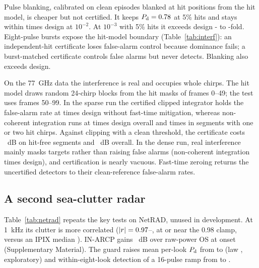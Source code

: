 \documentclass[journal]{IEEEtran}
\begin{document}
Pulse blanking, calibrated on clean episodes blanked at hit positions from the hit model, is cheaper but not certified. It keeps $P_{\rm d}=0.78$ at 5\% hits and stays within \BlankPfaMax{} times design at $10^{-2}$. At $10^{-3}$ with 5\% hits it exceeds design \BlankFiveThreeMin- to \BlankFiveThreeMax-fold. Eight-pulse bursts expose the hit-model boundary (Table~\ref{tab:interf}): an independent-hit certificate loses false-alarm control because dominance fails; a burst-matched certificate controls false alarms but never detects. Blanking also exceeds design.

On the 77~GHz data the interference is real and occupies whole chirps. The hit model draws random 24-chirp blocks from the hit masks of frames 0--49; the test uses frames 50--99. In the sparse run the certified clipped integrator holds the false-alarm rate at \JCertPfaC{} times design without fast-time mitigation, whereas non-coherent integration runs at \JDinPfaC{} times design overall and \JDinPfaCone{} times in segments with one or two hit chirps. Against clipping with a clean threshold, the certificate costs \JCertCostClean~dB on hit-free segments and \JCertCostAll~dB overall. In the dense run, real interference mainly masks targets rather than raising false alarms (non-coherent integration \JDinPfaA{} times design), and certification is nearly vacuous. Fast-time zeroing returns the uncertified detectors to their clean-reference false-alarm rates.

\subsection{A second sea-clutter radar}\label{sec:netrad}
\begin{table}[!t]
\centering\footnotesize
\caption{IPIX and NetRAD S-band sea clutter, same code and settings except the ANMF secondary cells (Section~\ref{sec:design}). Entries: $P_{\rm fa}/\alpha$ at $\alpha=0.01$ unless stated; guard row: per-look $P_{\rm d}$ at 10~dB, mean over looks 1--8; $P_{\rm d}$ in parentheses at 10~dB. Conformal rows: the 12 statistics other than the clipped integrator (conservative on IPIX). Injected interference 30~dB above the local power. Flagged pulses: NetRAD HH, certificate calibrated on their masks.}
\label{tab:netrad}
\setlength{\tabcolsep}{3pt}

\end{table}
Table~\ref{tab:netrad} repeats the key tests on NetRAD, unused in development. At 1~kHz its clutter is more correlated ($|r|=0.97$--\NetAbsRMax, at or near the 0.98 clamp, versus an IPIX median \IpixAbsRMed). IN-ARCP gains \NetOSGain~dB over raw-power OS at onset (Supplementary Material). The guard raises mean per-look $P_{\rm d}$ from \NetGuardZero{} to \NetGuardEight{} (law \NetLawEight, exploratory) and within-eight-look detection of a 16-pulse ramp from \NetRampZero{} to \NetRampEight.
\end{document}
